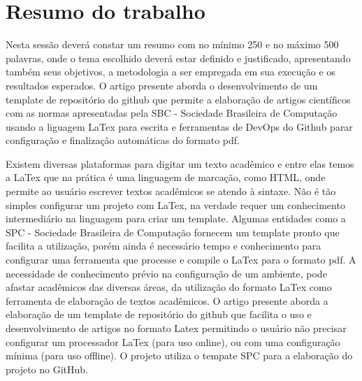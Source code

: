 \section{Resumo do trabalho}

Nesta sessão deverá constar um resumo com no mínimo 250 e no máximo 500 palavras, onde o tema escolhido deverá estar definido e justificado, apresentando também seus objetivos, a metodologia a ser empregada em sua execução e os resultados esperados.
O artigo presente aborda o desenvolvimento de um template de repositório do github que permite a elaboração de artigos científicos com as normas apresentadas pela SBC - Sociedade Brasileira de Computação usando a liguagem LaTex para escrita e ferramentas de DevOps do Github parar configuração e finalização automáticas do formato pdf.





Existem diversas plataformas para digitar um texto acadêmico e entre elas temos a LaTex que na prática é uma linguagem de marcação, como HTML, onde permite ao usuário escrever textos acadêmicos se atendo à sintaxe. Não é tão simples configurar um projeto com LaTex, na verdade requer um conhecimento intermediário na linguagem para criar um template. Algumas entidades como a SPC - Sociedade Brasileira de Computação fornecem um template pronto que facilita a utilização, porém ainda é necessário tempo e conhecimento para configurar uma ferramenta que processe e compile o LaTex para o formato pdf.
A necessidade de conhecimento prévio na configuração de um ambiente, pode afastar acadêmicos das diversas áreas, da utilização do formato LaTex como ferramenta de elaboração de textos acadêmicos.
O artigo presente aborda a elaboração de um template de repositório do github que facilita o uso e desenvolvimento de artigos no formato Latex permitindo o usuário não precisar configurar um processador LaTex (para uso online), ou com uma configuração mínima (para uso offline).
O projeto utiliza o tempate SPC para a elaboração do projeto no GitHub.